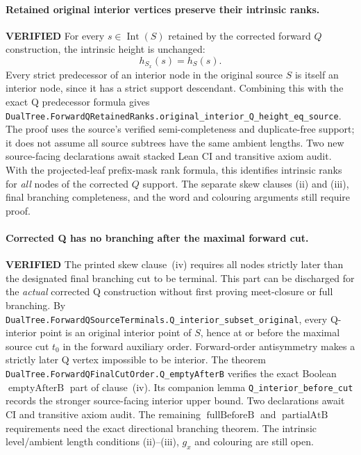 \documentclass[11pt]{article}
\newcommand{\ok}{\textcolor{green!40!black}{\textbf{VERIFIED}}}
\newcommand{\lean}[1]{\texttt{#1}}
\begin{document}
\paragraph{Retained original interior vertices preserve their intrinsic ranks.} \ok
For every $s\in\operatorname{Int}(S)$
retained by the corrected forward $Q$ construction,
the intrinsic height is unchanged:
\[
      h_{S_x}(s)=h_S(s).
\]
Every strict predecessor of an interior node
in the original source $S$ is itself an interior
node, since it has a strict support descendant.
Combining this with the exact Q predecessor
formula gives
\lean{DualTree.ForwardQRetainedRanks.original_interior_Q_height_eq_source}.
The proof uses the source's verified
semi-completeness and duplicate-free support;
it does not assume all source subtrees have
the same ambient lengths.
Two new source-facing declarations await
stacked Lean CI and transitive axiom audit.
With the projected-leaf prefix-mask
rank formula, this identifies intrinsic
ranks for \emph{all} nodes of the
corrected $Q$ support. The separate
skew clauses (ii) and (iii), final
branching completeness, and the word
and colouring arguments still require proof.

\paragraph{Corrected Q has no branching after the maximal forward cut.} \ok
The printed skew clause~(iv) requires all
nodes strictly later than the designated
final branching cut to be terminal.
This part can be discharged for the
\emph{actual} corrected Q construction
without first proving meet-closure or
full branching. By
\lean{DualTree.ForwardQSourceTerminals.Q_interior_subset_original},
every Q-interior point is an original
interior point of $S$, hence at or
before the maximal source cut $t_0$
in the forward auxiliary order.
Forward-order antisymmetry makes
a strictly later Q vertex impossible
to be interior. The theorem
\lean{DualTree.ForwardQFinalCutOrder.Q_emptyAfterB}
verifies the exact Boolean
$\operatorname{emptyAfterB}$ part
of clause~(iv). Its companion lemma
\lean{Q_interior_before_cut} records
the stronger source-facing interior
upper bound.
Two declarations await CI and
transitive axiom audit.
The remaining $\operatorname{fullBeforeB}$
and $\operatorname{partialAtB}$
requirements need the exact
directional branching theorem.
The intrinsic level/ambient length
conditions (ii)--(iii), $g_x$ and
colouring are still open.
\end{document}
